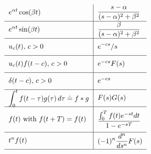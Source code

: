 \documentclass[12pt]{book}
\begin{document}
$$\begin{tabular}{ l |  l }
  \multirow{2}{*}{$\displaystyle e^{\a t}\cos(\b t)$}
  & \multirow{2}{*}{$\displaystyle \frac{s-\a}{(s-\a)^2 + \b^2}$} \\ \\ \hline
  \multirow{2}{*}{$\displaystyle e^{\a t}\sin(\b t)$}
  & \multirow{2}{*}{$\displaystyle \frac{\b}{(s-\a)^2 + \b^2}$} \\ \\ \hline
  \multirow{2}{*}{$\displaystyle u_c(t)$, $c > 0$}
  & \multirow{2}{*}{$\displaystyle {e^{-cs}}/{s}$} \\ \\ \hline
  \multirow{2}{*}{$u_c(t)f(t-c)$, $c > 0$}
  & \multirow{2}{*}{$e^{-cs}F(s)$} \\  \\ \hline
  \multirow{2}{*}{$\delta(t-c)$, $c > 0$} 
  & \multirow{2}{*}{$e^{-cs}$} \\  \\ \hline
  \multirow{2}{*}{$\displaystyle \int_0^t f(t-\t)g(\t) \,d\t \doteq f*g$} 
  & \multirow{2}{*}{$\displaystyle F(s)G(s)$} \\ \\ \hline
  \multirow{3}{*}{$\displaystyle f(t)$ with $\displaystyle f(t+T)=f(t)$}
  & \multirow{3}{*}{$\displaystyle \frac{\int_0^Tf(t) e^{-st}dt}{1-e^{-sT}}$}
  \\ \\ \\ \hline
  \multirow{2}{*}{$\displaystyle t^n f(t)$}
  & \multirow{2}{*}{$\displaystyle (-1)^n \frac{d^n}{ds^n} F(s)$} \\ \\ \hline
\end{tabular}\\
$$
\end{document}
